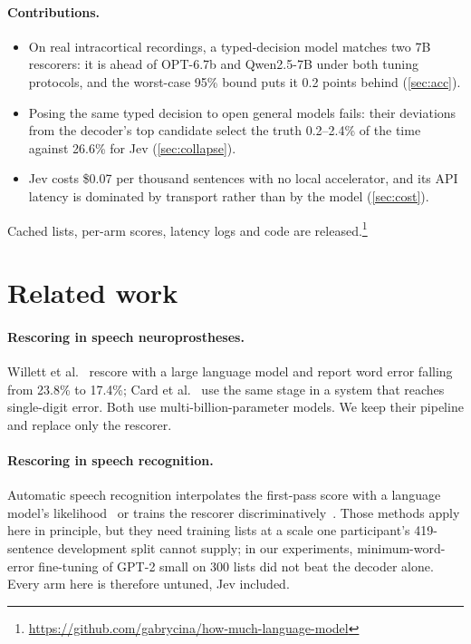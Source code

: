\documentclass[11pt]{article}
\begin{document}
\paragraph{Contributions.}
\begin{itemize}\itemsep2pt
\item On real intracortical recordings, a typed-decision model matches two 7B rescorers:
  it is ahead of OPT-6.7b and Qwen2.5-7B under both tuning protocols, and the worst-case
  95\% bound puts it 0.2 points behind (\cref{sec:acc}).
\item Posing the same typed decision to open general models fails: their deviations from
  the decoder's top candidate select the truth 0.2--2.4\% of the time against 26.6\% for
  Jev (\cref{sec:collapse}).
\item Jev costs \$0.07 per thousand sentences with no local accelerator, and its API
  latency is dominated by transport rather than by the model (\cref{sec:cost}).
\end{itemize}
Cached lists, per-arm scores, latency logs and code are
released.\footnote{\url{https://github.com/gabrycina/how-much-language-model}}

\section{Related work}
\label{sec:related}

\paragraph{Rescoring in speech neuroprostheses.} Willett et al.~\cite{willett2023} rescore
with a large language model and report word error falling from 23.8\% to 17.4\%; Card et
al.~\cite{card2024} use the same stage in a system that reaches single-digit error. Both
use multi-billion-parameter models. We keep their pipeline and replace only the rescorer.

\paragraph{Rescoring in speech recognition.} Automatic speech recognition interpolates the
first-pass score with a language model's likelihood~\cite{udagawa2022} or trains the
rescorer discriminatively~\cite{rescorebert,shivakumar2023disc,lob2023}. Those methods
apply here in principle, but they need training lists at a scale one participant's
419-sentence development split cannot supply; in our experiments, minimum-word-error
fine-tuning of GPT-2 small on 300 lists did not beat the decoder alone. Every arm here is
therefore untuned, Jev included.
\end{document}

